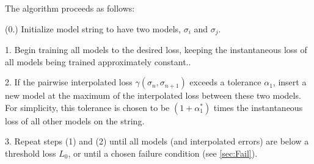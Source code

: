   The algorithm proceeds as follows:
  
  (0.) Initialize model string to have two models, $\sigma_i$ and $\sigma_j$.
  
  1. Begin training all models to the desired loss, keeping the instantaneous loss of all models being trained approximately constant..
  
  2. If the pairwise interpolated loss $\gamma(\sigma_n,\sigma_{n+1})$ exceeds a tolerance $\alpha_1$, insert a new model at the maximum of the interpolated loss between these two models.  For simplicity, this tolerance is chosen to be $(1 + \alpha_1^*)$ times the instantaneous loss of all other models on the string.  
  
  3. Repeat steps (1) and (2) until all models (and interpolated errors) are below a threshold loss $L_0$, or until a chosen failure condition (see \ref{sec:Fail}).


